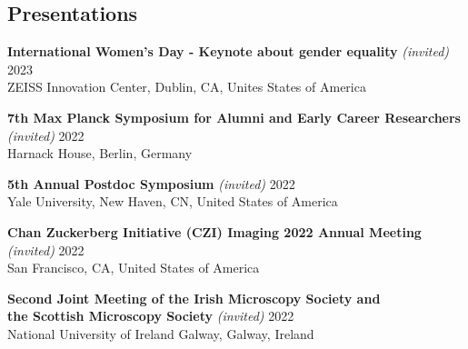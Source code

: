 \documentclass[margin,line]{res}
\begin{document}
\begin{resume}
\section{\sc  Presentations}

{\bf International Women's Day - Keynote about gender equality}  {\it (invited)} \hfill 2023\\
ZEISS Innovation Center, Dublin, CA, Unites States of America%

\vspace*{-3mm}
{\bf  7th Max Planck Symposium for Alumni and Early Career Researchers}  {\it (invited)} \hfill 2022\\
Harnack House, Berlin, Germany%

\vspace*{-3mm}
{\bf  5th Annual Postdoc Symposium}  {\it (invited)} \hfill 2022\\
Yale University, New Haven, CN, United States of America %

\vspace*{-3mm}
{\bf  Chan Zuckerberg Initiative (CZI) Imaging 2022 Annual Meeting}  {\it (invited)} \hfill 2022\\
San Francisco, CA, United States of America %


\clearpage

{\bf  Second Joint Meeting of the Irish Microscopy Society and \\the Scottish Microscopy Society}  {\it (invited)} \hfill 2022\\
National University of Ireland Galway, Galway, Ireland %


\end{resume}
\end{document}
